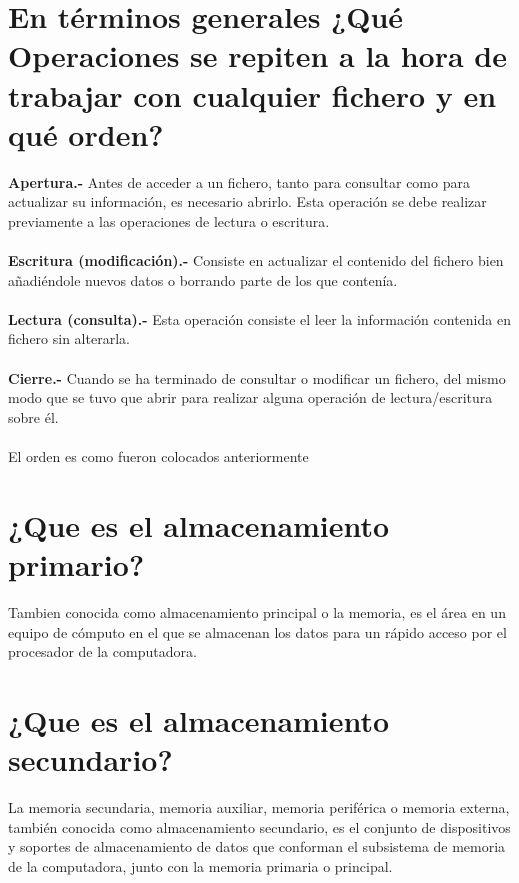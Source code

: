 \documentclass{article}
\begin{document}
\section{En términos generales ¿Qué Operaciones se repiten a la hora de trabajar con cualquier fichero y en qué orden?}
    \textbf{Apertura.-} Antes de acceder a un fichero, tanto para consultar como para actualizar su información, es necesario abrirlo. Esta operación se debe realizar previamente a las operaciones de lectura o escritura.
    \\\\
    \textbf{Escritura (modificación).-} Consiste en actualizar el contenido del fichero bien añadiéndole nuevos datos o borrando parte de los que contenía.
    \\\\
    \textbf{Lectura (consulta).-} Esta operación consiste el leer la información contenida en fichero sin alterarla.
    \\\\
    \textbf{Cierre.-} Cuando se ha terminado de consultar o modificar un fichero, del mismo modo que se tuvo que abrir para realizar alguna operación de lectura/escritura sobre él.
    \\\\
    El orden es como fueron colocados anteriormente

\section{¿Que es el almacenamiento primario?}
    Tambien conocida como almacenamiento principal o la memoria, es el área en un equipo de cómputo en el que se almacenan los datos para un rápido acceso por el procesador de la computadora.

\section{¿Que es el almacenamiento secundario?}
    La memoria secundaria, memoria auxiliar, memoria periférica o memoria externa, también conocida como almacenamiento secundario, es el conjunto de dispositivos y soportes de almacenamiento de datos que conforman el subsistema de memoria de la computadora, junto con la memoria primaria o principal.
\end{document}
